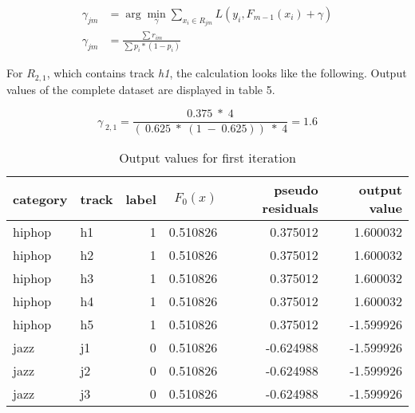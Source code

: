 \begin{equation}
    \begin{aligned}
        \gamma_{jm} &= \arg \min_{\gamma}\sum_{x_{i} \in R_{jm}} L(y_{i},F_{m-1}(x_{i}) + \gamma)
        \\
        \gamma_{jm} &= \frac{ \sum r_{im}}{\sum p_{i} * (1 - p_{i})}
        \label{equ:gb_output_value_theory}
    \end{aligned}
\end{equation}

For \(R_{2,1}\), which contains track \emph{h1}, the calculation looks like the following. Output values of the complete 
dataset are displayed in table 5.%

\begin{equation*}
\gamma_{\;2,1} = \frac{0.375\;*\;4}{(\:0.625\;*\;(1\;-\;0.625))\;*\;4} = 1.6 
\end{equation*}

\begin{table}[H]
    \centering
    \begin{tabular}{llrrrr}
        \toprule
        category & track &  label &  \(F_{0}(x)\) &  pseudo residuals &  output value \\
        \midrule
          hiphop &    h1 &      1 & 0.510826 &            0.375012 &        1.600032 \\
          hiphop &    h2 &      1 & 0.510826 &            0.375012 &        1.600032 \\
          hiphop &    h3 &      1 & 0.510826 &            0.375012 &        1.600032 \\
          hiphop &    h4 &      1 & 0.510826 &            0.375012 &        1.600032 \\
          hiphop &    h5 &      1 & 0.510826 &            0.375012 &       -1.599926 \\
            jazz &    j1 &      0 & 0.510826 &           -0.624988 &       -1.599926 \\
            jazz &    j2 &      0 & 0.510826 &           -0.624988 &       -1.599926 \\
            jazz &    j3 &      0 & 0.510826 &           -0.624988 &       -1.599926 \\
        \bottomrule
        \end{tabular}
    \caption{Output values for first iteration}%
    \label{tbl:theory_output_values_1_iteration}%
  \end{table} 

